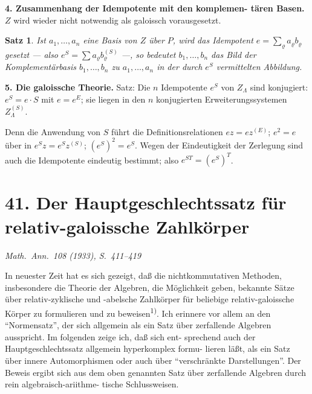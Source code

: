 \documentclass[12pt,a4paper]{article}
\theoremstyle{plain}
\newtheorem*{satz}{Satz}
\begin{document}
\medskip
\noindent\textbf{4. Zusammenhang der Idempotente mit den komplemen-\newline
 t\"aren Basen.}\hspace{0.5em}%
$Z$ wird wieder nicht notwendig als galoissch vorausgesetzt.

\begin{satz}
Ist $a_1, \ldots, a_n$ eine Basis von $Z$ \"uber $P$, wird das Idempotent
$e = \sum_\varrho a_\varrho b_\varrho$ gesetzt --- also $e^S = \sum a_\varrho b_\varrho^{(S)}$ ---, so bedeutet
$b_1, \ldots, b_n$ das Bild der Komplement\"arbasis $b_1, \ldots, b_n$ zu $a_1, \ldots, a_n$ in der
durch $e^S$ vermittelten Abbildung.
\end{satz}

\medskip
\noindent\textbf{5. Die galoissche Theorie.}\hspace{0.5em}%
Satz: Die $n$ Idempotente $e^S$ von $Z_\Lambda$ sind konjugiert: $e^S = e \cdot S$ mit
$e = e^E$; sie liegen in den $n$ konjugierten Erweiterungssystemen $Z_\Lambda^{(S)}$.

Denn die Anwendung von $S$ f\"uhrt die Definitionsrelationen $ez = e z^{(E)}$;
$e^2 = e$ \"uber in $e^S z = e^S z^{(S)}$; $(e^S)^2 = e^S$. Wegen der Eindeutigkeit der
Zerlegung sind auch die Idempotente eindeutig bestimmt; also $e^{ST} = (e^S)^T$.



\newpage
\section*{41. Der Hauptgeschlechtssatz f\"ur relativ-galoissche
Zahlk\"orper}
\label{sec:hauptgeschlecht}

\begin{center}
\small\textit{Math.\ Ann.\ 108 (1933), S.\ 411--419}
\end{center}


\medskip

In neuester Zeit hat es sich gezeigt, da\ss{} die nichtkommutativen
Methoden, insbesondere die Theorie der Algebren, die M\"oglichkeit geben,
bekannte S\"atze \"uber relativ-zyklische und -abelsche Zahlk\"orper f\"ur beliebige
relativ-galoissche K\"orper zu formulieren und zu beweisen\textsuperscript{1)}. Ich erinnere
vor allem an den ``Normensatz'', der sich allgemein als ein Satz \"uber
zerfallende Algebren ausspricht. Im folgenden zeige ich, da\ss{} sich ent-
sprechend auch der Hauptgeschlechtssatz allgemein hyperkomplex formu-
lieren l\"a\ss t, als ein Satz \"uber innere Automorphismen oder auch \"uber
``verschr\"ankte Darstellungen''. Der Beweis ergibt sich aus dem oben
genannten Satz \"uber zerfallende Algebren durch rein algebraisch-ariithme-
tische Schlussweisen.
\end{document}

